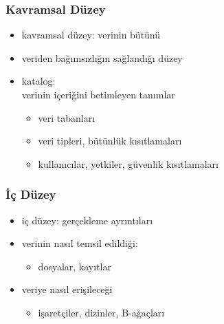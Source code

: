 \documentclass[dvipsnames]{beamer}
\theoremstyle{definition}
\theoremstyle{example}
\theoremstyle{plain}
\begin{document}
\begin{frame}
  \frametitle{Kavramsal Düzey}

  \begin{itemize}
    \item kavramsal düzey: verinin bütünü
    \item veriden bağımsızlığın sağlandığı düzey

    \pause
    \bigskip
    \item \alert{katalog}:\\
      verinin içeriğini betimleyen tanımlar
    \begin{itemize}
      \item veri tabanları
      \item veri tipleri, bütünlük kısıtlamaları
      \item kullanıcılar, yetkiler, güvenlik kısıtlamaları
    \end{itemize}
  \end{itemize}
\end{frame}

\begin{frame}
  \frametitle{İç Düzey}

  \begin{itemize}
    \item iç düzey: gerçekleme ayrıntıları

    \pause
    \medskip
    \item verinin nasıl temsil edildiği:
    \begin{itemize}
      \item dosyalar, kayıtlar
    \end{itemize}

    \item veriye nasıl erişileceği
    \begin{itemize}
      \item işaretçiler, dizinler, B-ağaçları
    \end{itemize}
  \end{itemize}
\end{frame}
\end{document}
